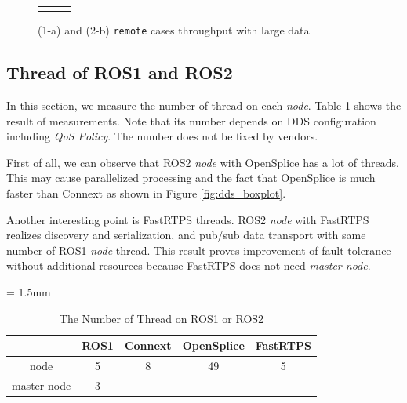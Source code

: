 \documentclass{sig-alternate-05-2015}
\begin{document}
\begin{figure}[t]
\begin{tabular}{ccc}
\begin{minipage}[t]{0.31\textwidth}
        \caption{(1-a) and (2-b) \texttt{remote} cases throughput with large data}
        \label{fig:throughput_large}
      \end{minipage}
    &
  \end{tabular}
\end{figure}

\subsection{Thread of ROS1 and ROS2}
\label{sec:throughput}
In this section, we measure the number of thread on each \emph{node}.
Table \ref{tb:thread} shows the result of measurements.
Note that its number depends on DDS configuration including \emph{QoS Policy}.
The number does not be fixed by vendors.

First of all, we can observe that ROS2 \emph{node} with OpenSplice has a lot of threads.
This may cause parallelized processing and the fact that OpenSplice is much faster than Connext as shown in Figure \ref{fig:dds_boxplot}.

Another interesting point is FastRTPS threads.
ROS2 \emph{node} with FastRTPS realizes discovery and serialization, and pub/sub data transport with same number of ROS1 \emph{node} thread.
This result proves improvement of fault tolerance without additional resources because FastRTPS does not need \emph{master-node}.

\renewcommand{\arraystretch}{1.1}
\begin{table}[t]
\caption{\label{tb:thread}The Number of Thread on ROS1 or ROS2}
\centering
\tabcolsep = 1.5mm              %
\begin{tabular}{c|cccc}
\hline
 & ROS1 & Connext & OpenSplice & FastRTPS \\
\hline
\hline
node & 5 & 8 & 49 & 5 \\
master-node & 3 & - & - & - \\
\hline
\end{tabular}
\end{table}
\end{document}
